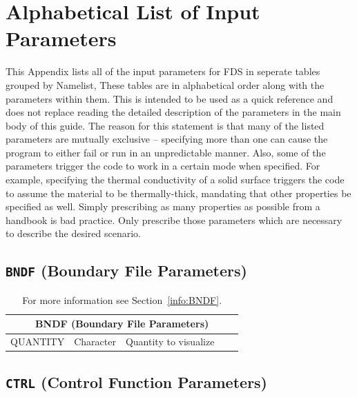 \documentclass[11pt]{book}
\begin{document}
\clearpage



\chapter{Alphabetical List of Input Parameters}%

This Appendix lists all of the input parameters for FDS in seperate tables grouped by Namelist,
These tables are in alphabetical order along with the parameters within them.
This is intended to be used as a quick reference and does not replace reading
the detailed description of the parameters in the main body of this guide.
The reason for this statement is that many of the listed parameters are mutually exclusive -- specifying more than
one can cause the program to either fail or run in an unpredictable manner. Also, some of the parameters trigger the
code to work in a certain mode when specified. For example, specifying the thermal conductivity of
a solid surface triggers the code to assume the material to be thermally-thick, mandating that other
properties be specified as well. Simply prescribing as many properties as possible from a handbook is bad practice.
Only prescribe those parameters which are necessary to describe the desired scenario.


\clearpage

\section{\texorpdfstring{{\tt BNDF}}{BNDF} (Boundary File Parameters)}

\hspace{1in}

\begin{table}[H]
\caption{For more information see Section~\ref{info:BNDF}.}\label{tbl:BNDF}
\noindent
\begin{tabular*}{6.5in}{@{\extracolsep\fill}|l|l|l|l|l|}
\hline
\multicolumn{5}{|c|}{{\ct BNDF} (Boundary File Parameters)} \\ \hline \hline
{\ct QUANTITY}     & Character   & Quantity to visualize &           &     \\ \hline
\end{tabular*}
\end{table}

\vspace{\baselineskip}

\vfill


\section{\texorpdfstring{{\tt CTRL}}{CTRL} (Control Function Parameters)}
\end{document}

